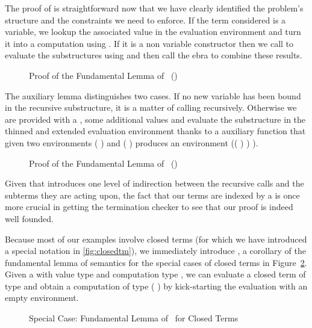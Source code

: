 The proof of  is straightforward now that we have clearly identified the
problem's structure and the constraints we need to enforce. If the term considered
is a variable, we lookup the associated value in the evaluation environment and
turn it into a computation using . If it is a non variable constructor
then we call  to evaluate the substructures using  and then
call the ebra to combine these results.

\begin{figure}[h]
\caption{Proof of the Fundamental Lemma of ~()}
\end{figure}

The auxiliary lemma  distinguishes two cases. If no new variable has
been bound in the recursive substructure, it is a matter of calling 
recursively. Otherwise we are provided with a , some additional
values and evaluate the substructure in the thinned and extended evaluation
environment thanks to a auxiliary function 
that given two environments
{( )  } and {( )  }
produces an environment {(( \AF{++} ) )  )}.

\begin{figure}[h]
\caption{Proof of the Fundamental Lemma of ~()\label{fig:genbody}}
\end{figure}

Given that  introduces one level of indirection between the recursive
calls and the subterms they are acting upon, the fact that our terms are indexed
by a  is once more crucial in getting the termination checker to see
that our proof is indeed well founded.

Because most of our examples involve closed terms (for which we have
introduced a special notation in \cref{fig:closedtm}), we immediately
introduce , a corollary of the fundamental lemma of semantics
for the special cases of closed terms in Figure~\ref{fig:closedsem}.
Given a  with value type  and computation type ,
we can evaluate a closed term of type  and obtain a computation of
type {(  \AIC{[]})} by kick-starting the evaluation with an
empty environment.

\begin{figure}[h]
\caption{Special Case: Fundamental Lemma of ~for Closed Terms\label{fig:closedsem}}
\end{figure}

